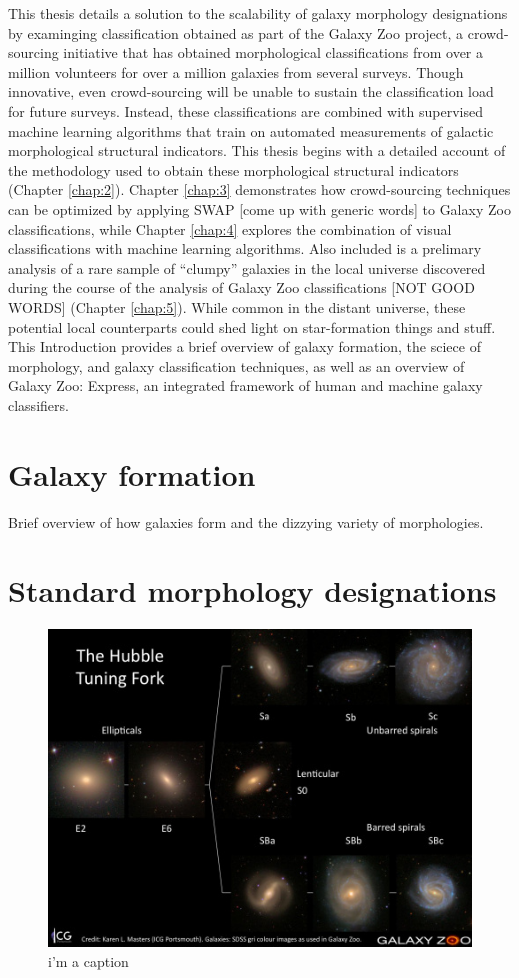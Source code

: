This thesis details a solution to the scalability of galaxy morphology designations by examinging classification obtained as part of the Galaxy Zoo project, a crowd-sourcing initiative that has obtained morphological classifications from over a million volunteers for over a million galaxies from several surveys. Though innovative, even crowd-sourcing will be unable to sustain the classification load for future surveys. Instead, these classifications are combined with supervised machine learning algorithms that train on automated measurements of galactic morphological structural indicators. This thesis begins with a detailed account of the methodology used to obtain these morphological structural indicators (Chapter \ref{chap:2}). Chapter \ref{chap:3} demonstrates how crowd-sourcing techniques can be optimized by applying SWAP [come up with generic words] to Galaxy Zoo classifications, while Chapter \ref{chap:4} explores the combination of visual classifications with machine learning algorithms. Also included is a prelimary analysis of a rare sample of ``clumpy'' galaxies in the local universe discovered during the course of the analysis of Galaxy Zoo classifications [NOT GOOD WORDS] (Chapter \ref{chap:5}). While common in the distant universe, these potential local counterparts could shed light on  star-formation things and stuff. This Introduction provides a brief overview of galaxy formation, the sciece of morphology, and galaxy classification techniques, as well as an overview of Galaxy Zoo: Express, an integrated framework of human and machine galaxy classifiers. 




\section{Galaxy formation}
Brief overview of how galaxies form and the dizzying variety of morphologies. 


\section{Standard morphology designations}
\begin{figure}
\centering
\includegraphics[width=4.5in]{Figures/Masters_tuningfork.jpg}
\caption[Hubble tuning fork]{i'm a caption}
\label{fig: tuning fork}
\end{figure}

